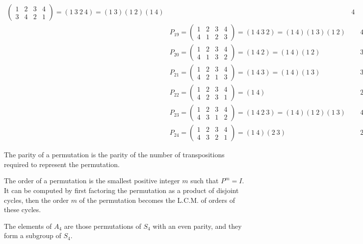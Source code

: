 \documentclass{article}
\begin{document}
\begin{align*}
\begin{pmatrix}
    1 & 2 & 3 & 4 \\
    3 & 4 & 2 & 1
  \end{pmatrix} = (1 \ 3 \ 2 \ 4) = (1 \ 3) (1 \ 2) (1 \ 4) &&4 &&Odd
  \\
  &P_{19} = \begin{pmatrix}
    1 & 2 & 3 & 4 \\
    4 & 1 & 2 & 3
  \end{pmatrix} = (1 \ 4 \ 3 \ 2) = (1 \ 4) (1 \ 3) (1 \ 2) &&4 &&Odd
  \\
  &P_{20} = \begin{pmatrix}
    1 & 2 & 3 & 4 \\
    4 & 1 & 3 & 2
  \end{pmatrix} = (1 \ 4 \ 2) = (1 \ 4) (1 \ 2) &&3 &&Even
  \\
  &P_{21} = \begin{pmatrix}
    1 & 2 & 3 & 4 \\
    4 & 2 & 1 & 3
  \end{pmatrix} = (1 \ 4 \ 3) = (1 \ 4) (1 \ 3) &&3 &&Even
  \\
  &P_{22} = \begin{pmatrix}
    1 & 2 & 3 & 4 \\
    4 & 2 & 3 & 1
  \end{pmatrix} = (1 \ 4) &&2 &&Odd
  \\
  &P_{23} = \begin{pmatrix}
    1 & 2 & 3 & 4 \\
    4 & 3 & 1 & 2
  \end{pmatrix} = (1 \ 4 \ 2 \ 3) = (1 \ 4) (1 \ 2) (1 \ 3) &&4 &&Odd
  \\
  &P_{24} = \begin{pmatrix}
    1 & 2 & 3 & 4 \\
    4 & 3 & 2 & 1
  \end{pmatrix} = (1 \ 4) (2 \ 3) &&2 &&Even
\end{align*}

\noindent
The parity of a permutation is the parity of the number of transpositions required to represent the permutation.
\newline

\noindent
The order of a permutation is the smallest positive integer $m$ such that $P^m = I$.
It can be computed by first factoring the permutation as a product of disjoint cycles, then the order $m$ of the permutation becomes the L.C.M. of orders of these cycles.
\newline

\noindent
The elements of $A_4$ are those permutations of $S_4$ with an even parity, and they form a subgroup of $S_4$.
\newline
\end{document}
